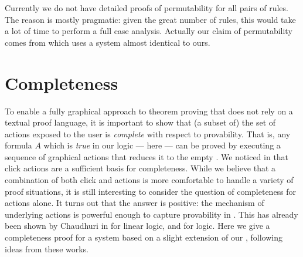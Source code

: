 \begin{scope}
\begin{remark}
Currently we do not have detailed proofs of permutability for all pairs of
rules. The reason is mostly pragmatic: given the great number of rules, this
would take a lot of time to perform a full case analysis. Actually our claim of
permutability comes from \cite{DBLP:conf/cade/Chaudhuri21} which uses a
 system almost identical to ours.
\end{remark}

\section{Completeness}

To enable a fully graphical approach to theorem proving that does not rely on a
textual proof language, it is important to show that (a subset of) the set of
actions exposed to the user is \emph{complete} with respect to provability. That
is, any formula $A$ which is \emph{true} in our logic --- here
  --- can be proved by executing a sequence of
graphical actions that reduces it to the empty . We noticed in
 that click actions are a sufficient basis for
completeness. While we believe that a combination of both click and 
actions is more comfortable to handle a variety of proof situations, it is still
interesting to consider the question of completeness for  actions alone.
It turns out that the answer is positive: the mechanism of \emph{} underlying  actions is powerful enough to capture provability
in . This has already been shown by Chaudhuri in \cite{Chaudhuri2013}
for linear logic, and \cite{DBLP:conf/cade/Chaudhuri21} for 
logic. Here we give a completeness proof for a system based on a slight
extension of our , following ideas from these works.


\end{scope}
